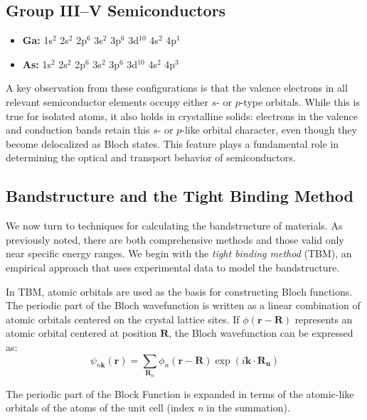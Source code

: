 \subsection*{Group III–V Semiconductors}

\begin{itemize}
	\item \textbf{Ga:} \quad 1s$^2$ 2s$^2$ 2p$^6$ 3s$^2$ 3p$^6$ 3d$^{10}$ 4s$^2$ 4p$^1$
	\item \textbf{As:} \quad 1s$^2$ 2s$^2$ 2p$^6$ 3s$^2$ 3p$^6$ 3d$^{10}$ 4s$^2$ 4p$^3$
\end{itemize}

A key observation from these configurations is that the valence electrons in all relevant semiconductor elements occupy either $s$- or $p$-type orbitals. While this is true for isolated atoms, it also holds in crystalline solids: electrons in the valence and conduction bands retain this $s$- or $p$-like orbital character, even though they become delocalized as Bloch states. This feature plays a fundamental role in determining the optical and transport behavior of semiconductors.

\subsection*{Bandstructure and the Tight Binding Method}

We now turn to techniques for calculating the bandstructure of materials. As previously noted, there are both comprehensive methods and those valid only near specific energy ranges. We begin with the \textit{tight binding method} (TBM), an empirical approach that uses experimental data to model the bandstructure.

In TBM, atomic orbitals are used as the basis for constructing Bloch functions. The periodic part of the Bloch wavefunction is written as a linear combination of atomic orbitals centered on the crystal lattice sites. If \( \phi(\mathbf{r} - \mathbf{R}) \) represents an atomic orbital centered at position \( \mathbf{R} \), the Bloch wavefunction can be expressed as:
\begin{equation*}
	\psi_{n\mathbf{k}}(\mathbf{r}) = \sum_{\mathbf{R}_n} \phi_n(\mathbf{r} - \mathbf{R}) \exp(i\mathbf{k} \cdot \mathbf{R_n})
\end{equation*}

The periodic part of the Block Function is expanded in terms of the atomic-like orbitals of the atoms of the unit cell (index \textit{n} in the summation).


